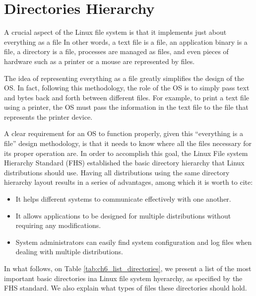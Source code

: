 \section{Directories Hierarchy}
\label{sec:ch6_hierarchy}

A crucial aspect of the Linux file system is that it implements just about everything as a file In other words, a text file is a file, an application binary is a file, a directory is a file, processes are managed as files, and even pieces of hardware such as a printer or a mouse are represented by files.

The idea of representing everything as a file greatly simplifies the design of the \acs{OS}. In fact, following this methodology, the role of the \acs{OS} is to simply pass text and bytes back and forth between different files. For example, to print a text file using a printer, the \acs{OS} must pass the information in the text file to the file that represents the printer device.

A clear requirement for an \acs{OS} to function properly, given this ``everything is a file'' design methodology, is that it needs to know where all the files necessary for its proper operation are. In order to accomplish this goal, the Linux File system Hierarchy Standard (\acs{FHS}) established the basic directory hierarchy that Linux distributions should use. Having all distributions using the same directory hierarchy layout results in a series of advantages, among which it is worth to cite:
\begin{itemize}
  \item It helps different systems to communicate effectively with one another.
  \item It allows applications to be designed for multiple distributions without requiring any modifications.
  \item System administrators can easily find system configuration and log files when dealing with multiple distributions.
\end{itemize}

In what follows, on Table \ref{tab:ch6_list_directories}, we present a list of the most important basic directories ina Linux file system hyerarchy, as specified by the \acs{FHS} standard. We also explain what types of files these directories should hold.

